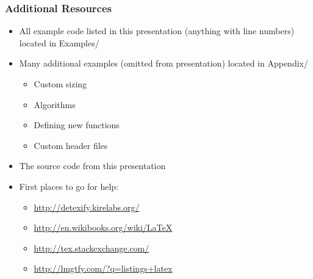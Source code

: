 \documentclass[notes=only]{beamer}
\begin{document}
\begin{frame}\frametitle{Additional Resources}
    \begin{itemize}
        \item All example code listed in this presentation (anything with line numbers) located in Examples/
        \item Many additional examples (omitted from presentation) located in Appendix/
            \begin{itemize}
                \item Custom sizing
                \item Algorithms
                \item Defining new functions
                \item Custom header files
            \end{itemize}
        \item The source code from this presentation    
        \item First places to go for help:\\
        \begin{itemize}
            \item \url{http://detexify.kirelabs.org/}
            \item \url{http://en.wikibooks.org/wiki/LaTeX}
            \item \url{http://tex.stackexchange.com/}
            \item \url{http://lmgtfy.com/?q=listings+latex}
        \end{itemize}
    \end{itemize}
\end{frame}
\end{document}
